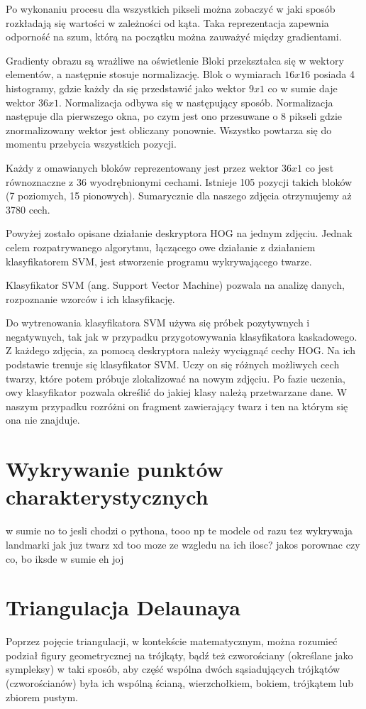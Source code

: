 Po wykonaniu procesu dla wszystkich pikseli można zobaczyć w jaki sposób rozkładają się wartości w zależności od kąta. Taka reprezentacja zapewnia odporność na szum, którą na początku można zauważyć między gradientami.

Gradienty obrazu są wrażliwe na oświetlenie
Bloki przekształca się w wektory elementów, a następnie stosuje normalizację. Blok o wymiarach $16x16$ posiada 4 histogramy, gdzie każdy da się przedstawić jako wektor $9x1$ co w sumie daje wektor $36x1$. Normalizacja odbywa się w następujący sposób. Normalizacja następuje dla pierwszego okna, po czym jest ono przesuwane o 8 pikseli gdzie znormalizowany wektor jest obliczany ponownie. Wszystko powtarza się do momentu przebycia wszystkich pozycji.

Każdy z omawianych bloków reprezentowany jest przez wektor $36x1$ co jest równoznaczne z 36 wyodrębnionymi cechami. Istnieje 105 pozycji takich bloków (7 poziomych, 15 pionowych). Sumarycznie dla naszego zdjęcia otrzymujemy aż 3780 cech.

Powyżej zostało opisane działanie deskryptora HOG na jednym zdjęciu. Jednak celem rozpatrywanego algorytmu, łączącego owe działanie z działaniem klasyfikatorem SVM, jest stworzenie programu wykrywającego twarze.

Klasyfikator SVM (ang. Support Vector Machine) pozwala na analizę danych, rozpoznanie wzorców i ich klasyfikację.

Do wytrenowania klasyfikatora SVM używa się próbek pozytywnych i negatywnych, tak jak w przypadku przygotowywania klasyfikatora kaskadowego. Z każdego zdjęcia, za pomocą deskryptora należy wyciągnąć cechy HOG. Na ich podstawie trenuje się klasyfikator SVM. Uczy on się różnych możliwych cech twarzy, które potem próbuje zlokalizować na nowym zdjęciu. Po fazie uczenia, owy klasyfikator pozwala określić do jakiej klasy należą przetwarzane dane. W naszym przypadku rozróżni on fragment zawierający twarz i ten na którym się ona nie znajduje. 


\section{Wykrywanie punktów charakterystycznych}
w sumie no to jesli chodzi o pythona, tooo np te modele od razu tez wykrywaja landmarki jak juz twarz xd too moze ze wzgledu na ich ilosc? jakos porownac czy co, bo iksde w sumie eh joj

\section{Triangulacja Delaunaya}
Poprzez pojęcie triangulacji, w kontekście matematycznym, można rozumieć podział figury geometrycznej na trójkąty, bądź też czworościany (określane jako sympleksy) w taki sposób, aby część wspólna dwóch sąsiadujących trójkątów (czworościanów) była ich wspólną ścianą, wierzchołkiem, bokiem, trójkątem lub zbiorem pustym. \cite{triangulation}

